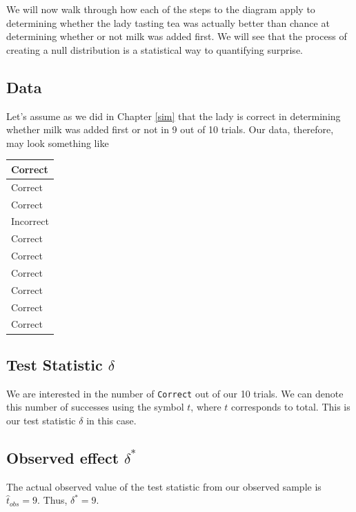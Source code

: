 \documentclass[]{tufte-book}
\theoremstyle{definition}
\theoremstyle{definition}
\theoremstyle{remark}
\begin{document}
We will now walk through how each of the steps to the diagram apply to
determining whether the lady tasting tea was actually better than chance
at determining whether or not milk was added first. We will see that the
process of creating a null distribution is a statistical way to
quantifying surprise.

\subsection{Data}\label{data}

Let's assume as we did in Chapter \ref{sim} that the lady is correct in
determining whether milk was added first or not in 9 out of 10 trials.
Our data, therefore, may look something like

\begin{tabular}{l}
\hline
Correct\\
\hline
Correct\\
\hline
Correct\\
\hline
Incorrect\\
\hline
Correct\\
\hline
Correct\\
\hline
Correct\\
\hline
Correct\\
\hline
Correct\\
\hline
Correct\\
\hline
\end{tabular}

\subsection{\texorpdfstring{Test Statistic
\(\delta\)}{Test Statistic \textbackslash{}delta}}\label{test-statistic-delta}

We are interested in the number of \texttt{Correct} out of our 10
trials. We can denote this number of successes using the symbol \(t\),
where \(t\) corresponds to total. This is our test statistic \(\delta\)
in this case.

\subsection{\texorpdfstring{Observed effect
\(\delta^*\)}{Observed effect \textbackslash{}delta\^{}*}}\label{observed-effect-delta}

The actual observed value of the test statistic from our observed sample
is \(\hat{t}_{obs} = 9\). Thus, \(\delta^* = 9\).
\end{document}
